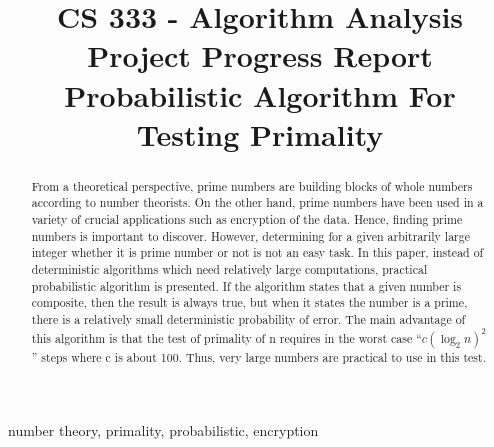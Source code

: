 \documentclass[conference]{IEEEtran}
\begin{document}
\title{ \large{CS 333 - Algorithm Analysis} \\ 
        \Huge{Project Progress Report}\\
        {\large Probabilistic Algorithm For Testing Primality\cite{rabin1980probabilistic} }
}

\author{
\and
{}
\and
{}
}

\maketitle

\begin{abstract}
From a theoretical perspective, prime numbers are building blocks of whole numbers according to number theorists. On the other hand, prime numbers have been used in a variety of crucial applications such as encryption of the data. Hence, finding prime numbers is important to discover. However, determining for a given arbitrarily large integer whether it is prime number or not is not an easy task. In this paper, instead of deterministic algorithms which need relatively large computations, practical probabilistic algorithm is presented. If the algorithm states that a given number is composite, then the result is always true, but when it states the number is a prime, there is a relatively small deterministic probability of error. The main advantage of this algorithm is that the test of primality of n requires in the worst case “$c(\log_2 n)^2$” steps where c is about 100. Thus, very large numbers are practical to use in this test.
\end{abstract}

\begin{IEEEkeywords}
number theory, primality, probabilistic, encryption
\end{IEEEkeywords}
\end{document}
